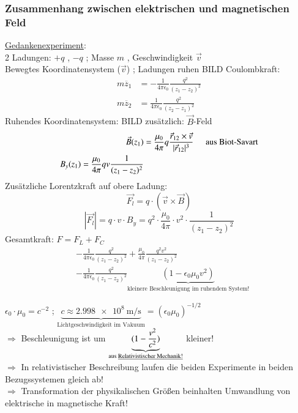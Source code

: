 \subsubsection{Zusammenhang zwischen elektrischen und magnetischen Feld}
\underline{Gedankenexperiment}: \\
2 Ladungen: \hspace{5mm} $ +q $ , $ -q $ ; Masse $ m $ , Geschwindigkeit $ \vec{v} $ \\
Bewegtes Koordinatensystem ($ \vec{v} $) ; Ladungen ruhen
BILD
Coulombkraft:
\begin{align*}
	m\ddot{z_1} &= - \frac{1}{4\pi\epsilon_0} \frac{q^2}{(z_1-z_2)^2} \\
	m\ddot{z_2} &= \frac{1}{4\pi\epsilon_0} \frac{q^2}{(z_2-z_1)^2}
\end{align*}
Ruhendes Koordinatensystem:
BILD
zusätzlich: $ \vec{B} $-Feld
\begin{align*}
	\vec{B}(z_1) &= \frac{\mu_0}{4\pi}q\frac{\vec{r}_{12} \times \vec{v}}{| \vec{r}_{12} |^3} \hspace{5mm} \text{aus Biot-Savart} \\
	B_y(z_1) = \frac{\mu_0}{4\pi}qv\frac{1}{( z_1-z_2 )^2}
\end{align*}
Zusätzliche Lorentzkraft auf obere Ladung: \\
$$ \vec{F_l} = q \cdot (\vec{v}\times \vec{B}) $$
$$ |\vec{F_l}| = q \cdot v \cdot B_y = q^2 \cdot \frac{\mu_0}{4\pi} \cdot v^2 \cdot \frac{1}{(z_1-z_2)^2} $$
Gesamtkraft: $ F=F_L+F_C $
\begin{align*}
&-\frac{1}{4\pi\epsilon_0} \frac{q^2}{(z_1-z_2)^2} + \frac{\mu_0}{4\pi} \frac{q^2v^2}{(z_1-z_2)^2}\\
&-\frac{1}{4\pi\epsilon_0} \frac{q^2}{(z_1-z_2)^2} \underbrace{(1-\epsilon_0\mu_0v^2)}_{\text{kleinere Beschleunigung im ruhendem System!}}
\end{align*}

$ \epsilon_0 \cdot \mu_0 = c^{-2}$ ; $  \underbrace{c \approx \SI{2,998e8}{\meter\per\second}}_{\text{Lichtgeschwindigkeit im Vakuum}} = (\epsilon_0\mu_0)^{-1/2} $ \\
$ \Rightarrow $ Beschleunigung ist um $ \underbrace{( 1-\frac{v^2}{c^2} )}_{\text{aus \underline{Relativistischer Mechanik!}}} $ kleiner!\\
$ \Rightarrow $ In relativistischer Beschreibung laufen die beiden Experimente in beiden Bezugssystemen gleich ab! \\
$ \Rightarrow $ Transformation der physikalischen Größen beinhalten Umwandlung von elektrische in magnetische Kraft!